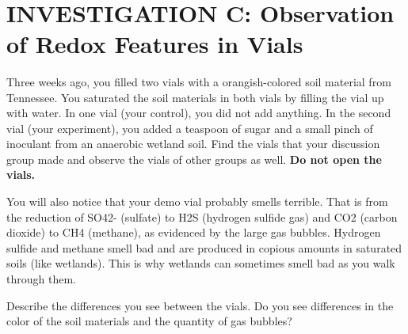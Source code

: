 \documentclass[
  letterpaper,
  twocolumn,
  portrait]{scrbook}
\begin{document}
~ ~ ~

\hypertarget{investigation-c-observation-of-redox-features-in-vials}{%
\section{INVESTIGATION C: Observation of Redox Features in
Vials}\label{investigation-c-observation-of-redox-features-in-vials}}

Three weeks ago, you filled two vials with a orangish-colored soil
material from Tennessee. You saturated the soil materials in both vials
by filling the vial up with water. In one vial (your control), you did
not add anything. In the second vial (your experiment), you added a
teaspoon of sugar and a small pinch of inoculant from an anaerobic
wetland soil. Find the vials that your discussion group made and observe
the vials of other groups as well. \textbf{Do not open the vials.}

You will also notice that your demo vial probably smells terrible. That
is from the reduction of SO42- (sulfate) to H2S (hydrogen sulfide gas)
and CO2 (carbon dioxide) to CH4 (methane), as evidenced by the large gas
bubbles. Hydrogen sulfide and methane smell bad and are produced in
copious amounts in saturated soils (like wetlands). This is why wetlands
can sometimes smell bad as you walk through them.

Describe the differences you see between the vials. Do you see
differences in the color of the soil materials and the quantity of gas
bubbles?

 
  \providecommand{\huxb}[2]{\arrayrulecolor[RGB]{#1}\global\arrayrulewidth=#2pt}
  \providecommand{\huxvb}[2]{\color[RGB]{#1}\vrule width #2pt}
  \providecommand{\huxtpad}[1]{\rule{0pt}{#1}}
  \providecommand{\huxbpad}[1]{\rule[-#1]{0pt}{#1}}
\end{document}

